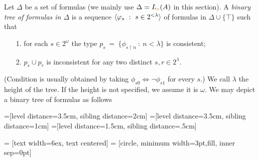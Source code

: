 \documentclass[creche.tex]{subfiles}
\begin{document}
\begin{definition}\label{def_tree_formulas}
Let $\Delta$ be a set of formulas (we mainly use $\Delta=L_{\color{brown} x}(A)$ in this section). A \emph{binary tree of formulas in $\Delta$\/} is a sequence $\<\phi_s\ :\ s\in2^{<\lambda}\>$ of formulas in $\Delta\cup\{\top\}$ such that\nobreak
\begin{itemize}
\item[1.] for each $s\in 2^\omega$ the type $p_s\ =\ \big\{\phi_{s\restriction n}\ :\ n<\lambda\big\}$ is consistent;
\item[2.] $p_s\cup p_r$ is inconsistent for any two distinct $s,r\in 2^\lambda$.
\end{itemize}
(Condition  is usually obtained by taking $\phi_{s0}\iff\neg\phi_{s1}$ for every $s$.) We call $\lambda$ the height of the tree. If the height is not specified, we assume it is $\omega$. We may depict a binary tree of formulas as follows


=[level distance=3.5cm, sibling distance=2cm]
=[level distance=3.5cm, sibling distance=1cm]
=[level distance=1.5cm, sibling distance=.5cm]

 = [text width=6ex, text centered]
 = [circle, minimum width=3pt,fill, inner sep=0pt]

\def\leaf{. . .}


\end{definition}
\end{document}
